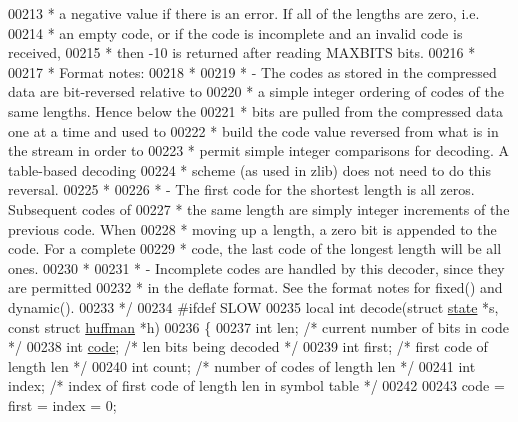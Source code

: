 \begin{DoxyCode}
00213 \textcolor{comment}{ * a negative value if there is an error.  If all of the lengths are zero, i.e.}
00214 \textcolor{comment}{ * an empty code, or if the code is incomplete and an invalid code is received,}
00215 \textcolor{comment}{ * then -10 is returned after reading MAXBITS bits.}
00216 \textcolor{comment}{ *}
00217 \textcolor{comment}{ * Format notes:}
00218 \textcolor{comment}{ *}
00219 \textcolor{comment}{ * - The codes as stored in the compressed data are bit-reversed relative to}
00220 \textcolor{comment}{ *   a simple integer ordering of codes of the same lengths.  Hence below the}
00221 \textcolor{comment}{ *   bits are pulled from the compressed data one at a time and used to}
00222 \textcolor{comment}{ *   build the code value reversed from what is in the stream in order to}
00223 \textcolor{comment}{ *   permit simple integer comparisons for decoding.  A table-based decoding}
00224 \textcolor{comment}{ *   scheme (as used in zlib) does not need to do this reversal.}
00225 \textcolor{comment}{ *}
00226 \textcolor{comment}{ * - The first code for the shortest length is all zeros.  Subsequent codes of}
00227 \textcolor{comment}{ *   the same length are simply integer increments of the previous code.  When}
00228 \textcolor{comment}{ *   moving up a length, a zero bit is appended to the code.  For a complete}
00229 \textcolor{comment}{ *   code, the last code of the longest length will be all ones.}
00230 \textcolor{comment}{ *}
00231 \textcolor{comment}{ * - Incomplete codes are handled by this decoder, since they are permitted}
00232 \textcolor{comment}{ *   in the deflate format.  See the format notes for fixed() and dynamic().}
00233 \textcolor{comment}{ */}
00234 \textcolor{preprocessor}{#ifdef SLOW}
00235 local \textcolor{keywordtype}{int} decode(\textcolor{keyword}{struct} \hyperlink{structstate}{state} *s, \textcolor{keyword}{const} \textcolor{keyword}{struct} \hyperlink{structhuffman}{huffman} *h)
00236 \{
00237     \textcolor{keywordtype}{int} len;            \textcolor{comment}{/* current number of bits in code */}
00238     \textcolor{keywordtype}{int} \hyperlink{structcode}{code};           \textcolor{comment}{/* len bits being decoded */}
00239     \textcolor{keywordtype}{int} first;          \textcolor{comment}{/* first code of length len */}
00240     \textcolor{keywordtype}{int} count;          \textcolor{comment}{/* number of codes of length len */}
00241     \textcolor{keywordtype}{int} index;          \textcolor{comment}{/* index of first code of length len in symbol table */}
00242 
00243     code = first = index = 0;

\end{DoxyCode}
